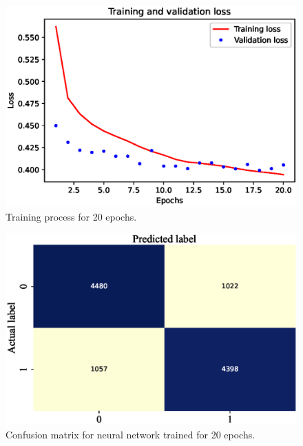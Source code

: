 \documentclass[11pt, a4paper, jou]{apa7}
\begin{document}
\begin{figure}[p]
    \centering
    \caption{Training process for 20 epochs. }\label{fig:nn_20}
    \includegraphics[width=.45\textwidth]{figures/error_20.eps}
\end{figure}


\begin{figure}[p]
    \centering
    \caption{Confusion matrix for neural network trained for 20 epochs. }\label{fig:nn_cm}
    \includegraphics[width=.45\textwidth]{figures/nn_cm.eps}
\end{figure}

\begin{table}[p]
    \centering
    \caption{Classification results of SVM using PCA and gaussian kernel function on the test set. }\label{tab:nn_summary}
\end{table}
\end{document}
